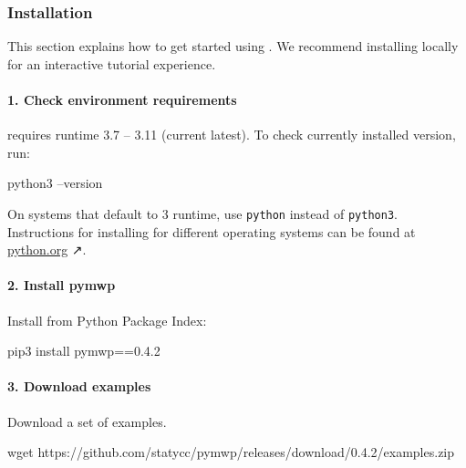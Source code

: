 \subsubsection{Installation}\label{guide-install}

This section explains how to get started using . We recommend
installing  locally for an interactive tutorial experience.

\paragraph*{1. Check environment requirements}

 requires  runtime 3.7 -- 3.11 (current latest).
To check currently installed version, run:

\begin{center}
\begin{minipage}{\textwidth}
\begin{cmdlisting}[label={lst:python-version}]
python3 --version
\end{cmdlisting}
\end{minipage}
\end{center}

On systems that default to  3 runtime, use \texttt{python} instead
of \texttt{python3}. Instructions for installing  for different
operating systems can be found at \href{https://python.org}{python.org} ↗.

\paragraph*{2. Install pymwp}
Install  from Python Package Index:

\begin{center}
\begin{minipage}{\textwidth}
\begin{cmdlisting}[label={lst:install-cmd}]
pip3 install pymwp==0.4.2
\end{cmdlisting}
\end{minipage}
\end{center}

\paragraph*{3. Download examples}
Download a set of examples.

\begin{center}
\begin{minipage}{\textwidth}
\begin{cmdlisting}[label={lst:get-examples}]
wget https://github.com/statycc/pymwp/releases/download/0.4.2/examples.zip
\end{cmdlisting}
\end{minipage}
\end{center}

